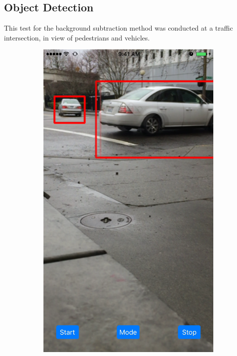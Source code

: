 \documentclass[11pt,letterpaper]{article}
\begin{document}
	\newpage
	\subsection*{Object Detection}
	This test for the background subtraction method was conducted at a traffic intersection, in view of pedestrians and vehicles. \\
	
	\begin{figure}[h!]
		\centering
		\begin{subfigure}{.4\textwidth}
			\centering
			\includegraphics[width=1\linewidth]{mode2a}

\end{subfigure}
\end{figure}
\end{document}

